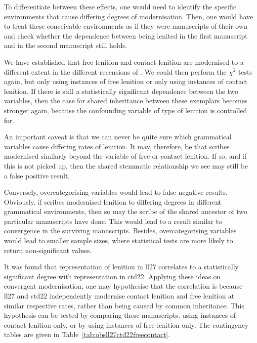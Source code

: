 To differentiate between these effects, one would need to identify the specific environments that cause differing degrees of modernisation. Then, one would have to treat these conceivable environments as if they were manuscripts of their own and check whether the dependence between being lenited in the first manuscript and in the second manuscript still holds.

We have established that free lenition and contact lenition are modernised to a different extent in the different recensions of . We could then perform the \(\chi^2\) tests again, but only using instances of free lenition or only using instances of contact lenition. If there is still a statistically significant dependence between the two variables, then the case for shared inheritance between these exemplars becomes stronger again, because the confounding variable of type of lenition is controlled for.

An important caveat is that we can never be quite sure which grammatical variables cause differing rates of lenition. It may, therefore, be that scribes modernised similarly beyond the variable of free or contact lenition. If so, and if this is not picked up, then the shared stemmatic relationship we see may still be a false positive result.

Conversely, overcategorising variables would lead to false negative results. Obviously, if scribes modernised lenition to differing degrees in different grammatical environments, then so may the scribe of the shared ancestor of two particular manuscripts have done. This would lead to a result similar to convergence in the surviving manuscripts. Besides, overcategorising variables would lead to smaller sample sizes, where statistical tests are more likely to return non-significant values.

It was found that representation of lenition in \gls{ll27} correlates to a statistically significant degree with representation in \gls{ctd22}. Applying these ideas on convergent modernisation, one may  hypothesise that the correlation is because \gls{ll27} and \gls{ctd22} independently modernise contact lenition and free lenition at similar respective rates, rather than being caused by common inheritance. This hypothesis can be tested by comparing these manuscripts, using instances of contact lenition only, or by using instances of free lenition only. The contingency tables are given in Table~\ref{tab:obsll27ctd22freecontact}.

